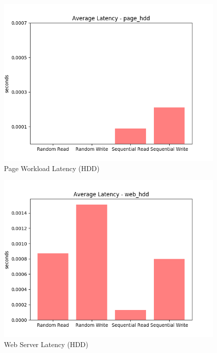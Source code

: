\documentclass[10pt, author, twocolumn]{article}
\begin{document}
\begin{figure}[h!]
    \includegraphics[scale=0.5]{../graphs/page_hdd-lat.png}
    \caption{Page Workload Latency (HDD)}
    \label{fig:hdd_page_lat}
\end{figure}

\begin{figure}[h!]
    \includegraphics[scale=0.5]{../graphs/web_hdd-lat.png}
    \caption{Web Server Latency (HDD)}
    \label{fig:hhd_web_lat}
\end{figure}
\end{document}

